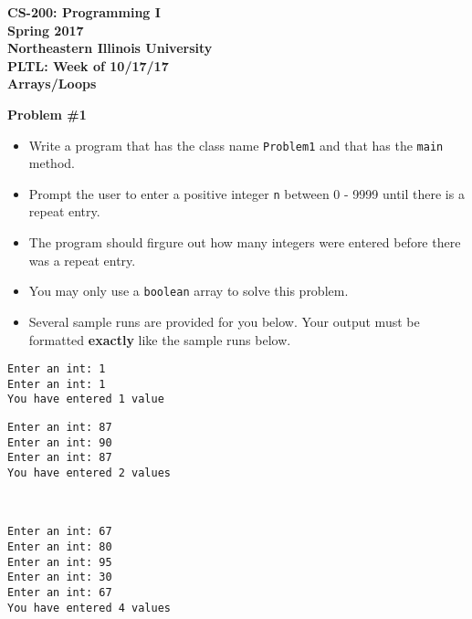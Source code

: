 \documentclass[12pt]{article}
\begin{document}
\begin{center}
	\textbf{CS-200: Programming I}\\
	\textbf{Spring 2017}\\
	\textbf{Northeastern Illinois University}\\
	\textbf{PLTL: Week of 10/17/17}\\
	\textbf{Arrays/Loops}
\end{center}


\noindent\textbf{Problem \#1}
\begin{itemize}
	\item Write a program that has the class name \texttt{Problem1} and that has the \texttt{main} method.
	\item Prompt the user to enter a positive integer \texttt{n} between 0 - 9999 until there is a repeat entry.
	\item The program should firgure out how many integers were entered before there was a repeat entry.
	\item You may only use a \texttt{boolean} array to solve this problem.
	\item Several sample runs are provided for you below. Your output must be formatted \textbf{exactly} like the sample runs below. 
\end{itemize}
\begin{center}
\begin{minipage}{5.6cm}
\begin{lstlisting}[escapechar=$]
Enter an int: 1
Enter an int: 1
You have entered 1 value
\end{lstlisting}
\end{minipage}
\hspace*{0.5cm}
\begin{minipage}{5.6cm}
\begin{lstlisting}[escapechar=$]
Enter an int: 87
Enter an int: 90
Enter an int: 87
You have entered 2 values
\end{lstlisting}
\end{minipage}\\
\begin{minipage}{5.6cm}
\begin{lstlisting}[escapechar=$]
Enter an int: 67
Enter an int: 80
Enter an int: 95
Enter an int: 30
Enter an int: 67
You have entered 4 values
\end{lstlisting}
\end{minipage}
\hspace*{0.5cm}
\end{center}
\end{document}
